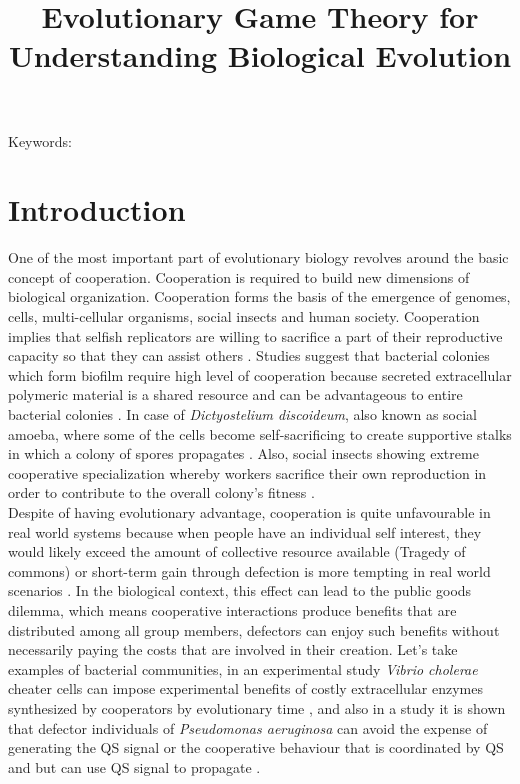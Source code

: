 \documentclass{article}
\title{\vspace*{-22mm}\bf Evolutionary Game Theory for Understanding Biological Evolution}
\date{}
\begin{document}
\linenumbers
\maketitle




\noindent
Keywords: 


\tableofcontents
\section{Introduction}
One of the most important part of evolutionary biology revolves around the basic concept of cooperation. Cooperation is required to build new dimensions of biological organization. Cooperation forms the basis of the emergence of genomes, cells, multi-cellular organisms, social insects and human society. Cooperation implies that selfish replicators are willing to sacrifice a part of their reproductive capacity so that they can assist others \citep{Nowak2006}.
Studies suggest that bacterial colonies which form biofilm require high level of cooperation because secreted extracellular polymeric material is a shared resource and can be advantageous to entire bacterial colonies \citep{Xavier2007}. In case of \textit{Dictyostelium discoideum}, also known as social amoeba, where some of the cells become self-sacrificing to create supportive stalks in which a colony of spores propagates \citep{Medina2024}. Also, social insects showing extreme cooperative specialization whereby workers sacrifice their own reproduction in order to contribute to the overall colony's fitness \citep{Fischman2011}.\\
Despite of having evolutionary advantage, cooperation is quite unfavourable in real world systems because when people have an individual self interest, they would likely exceed the amount of collective resource available (Tragedy of commons) or short-term gain through defection is more tempting in real world scenarios \citep{Rankin2007}.
In the biological context, this effect can lead to the public goods dilemma, which means cooperative interactions produce benefits that are distributed among all group members, defectors can enjoy such benefits without necessarily paying the costs that are involved in their creation. 
Let's take examples of bacterial communities, in an experimental study  \textit{Vibrio cholerae} cheater cells can impose experimental benefits of costly extracellular enzymes synthesized by cooperators by evolutionary time \citep{Schluter2015}, and also in a study it is shown that defector individuals of \textit{Pseudomonas aeruginosa} can avoid the expense of generating the QS signal or the cooperative behaviour that is coordinated by QS and but can use QS signal to propagate \citep{Diggle2007}.\\
\end{document}
